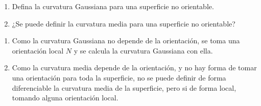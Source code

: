 \documentclass{homework}
\begin{document}
\begin{prob}
    \begin{enumerate}
        \item Defina la curvatura Gaussiana para una superficie no orientable.
        \item ¿Se puede definir la curvatura media para una superficie no orientable?
    \end{enumerate}
\end{prob}

\begin{sol}
    \begin{enumerate}
        \item Como la curvatura Gaussiana no depende de la orientación, se toma una orientación local \(N\) y se calcula la curvatura Gaussiana con ella.
        \item Como la curvatura media depende de la orientación, y no hay forma de tomar una orientación para toda la superficie, no se puede definir de forma diferenciable la curvatura media de la superficie, pero si de forma local, tomando alguna orientación local.
    \end{enumerate}
\end{sol}
\end{document}

